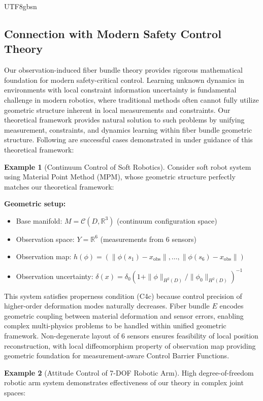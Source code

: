 \documentclass[a4paper,12pt]{extarticle}
\theoremstyle{definition}
\newtheorem{example}{Example}
\begin{document}
\begin{CJK}{UTF8}{gbsn}
\subsection{Connection with Modern Safety Control Theory} \label{{sec:applications}}

Our observation-induced fiber bundle theory provides rigorous mathematical foundation for modern safety-critical control. Learning unknown dynamics in environments with local constraint information uncertainty is fundamental challenge in modern robotics, where traditional methods often cannot fully utilize geometric structure inherent in local measurements and constraints. Our theoretical framework provides natural solution to such problems by unifying measurement, constraints, and dynamics learning within fiber bundle geometric structure. Following are successful cases demonstrated in \cite{zheng2025learning} under guidance of this theoretical framework:

\begin{example}[Continuum Control of Soft Robotics]
Consider soft robot system using Material Point Method (MPM), whose geometric structure perfectly matches our theoretical framework:

\textbf{Geometric setup:}
\begin{itemize}
\item Base manifold: $M = \mathcal{C}(D, \mathbb{R}^3)$ (continuum configuration space)
\item Observation space: $Y = \mathbb{R}^6$ (measurements from 6 sensors)
\item Observation map: $h(\phi) = (\|\phi(s_1) - x_{\text{obs}}\|, \ldots, \|\phi(s_6) - x_{\text{obs}}\|)$
\item Observation uncertainty: $\delta(x) = \delta_0(1 + \|\phi\|_{H^2(D)}/\|\phi_0\|_{H^2(D)})^{-1}$
\end{itemize}

This system satisfies properness condition (C4c) because control precision of higher-order deformation modes naturally decreases. Fiber bundle $E$ encodes geometric coupling between material deformation and sensor errors, enabling complex multi-physics problems to be handled within unified geometric framework. Non-degenerate layout of 6 sensors ensures feasibility of local position reconstruction, with local diffeomorphism property of observation map providing geometric foundation for measurement-aware Control Barrier Functions.
\end{example}

\begin{example}[Attitude Control of 7-DOF Robotic Arm]
High degree-of-freedom robotic arm system demonstrates effectiveness of our theory in complex joint spaces:


\end{example}
\end{CJK}
\end{document}
